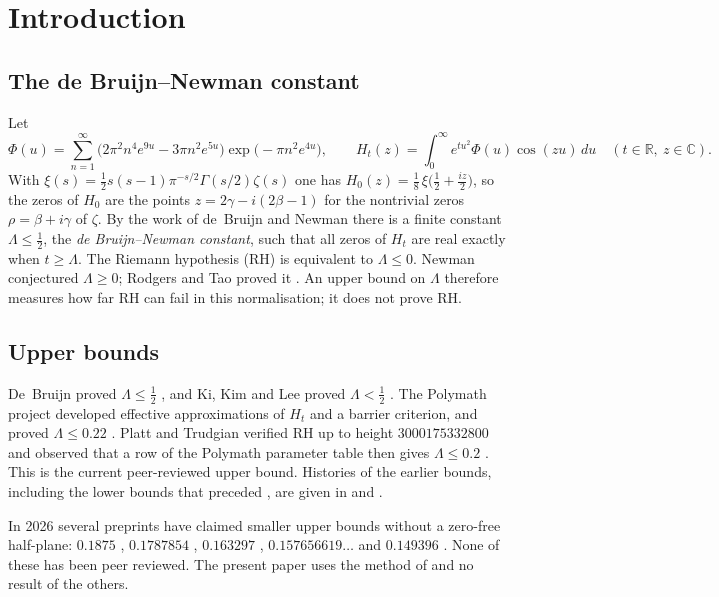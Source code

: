 \documentclass[11pt]{article}
\theoremstyle{definition}
\newcommand{\LB}{\Lambda}
\newcommand{\R}{\mathbb{R}}
\newcommand{\C}{\mathbb{C}}
\begin{document}
\section{Introduction}

\subsection{The de Bruijn--Newman constant}

Let
\[
\Phi(u)=\sum_{n=1}^{\infty}\bigl(2\pi^2n^4e^{9u}-3\pi n^2e^{5u}\bigr)\exp\bigl(-\pi n^2e^{4u}\bigr),
\qquad
H_t(z)=\int_0^\infty e^{tu^2}\Phi(u)\cos(zu)\,du
\quad(t\in\R,\ z\in\C).
\]
With $\xi(s)=\tfrac12s(s-1)\pi^{-s/2}\Gamma(s/2)\zeta(s)$ one has
$H_0(z)=\tfrac18\,\xi\bigl(\tfrac12+\tfrac{iz}2\bigr)$, so the zeros of $H_0$ are the
points $z=2\gamma-i(2\beta-1)$ for the nontrivial zeros $\rho=\beta+i\gamma$ of $\zeta$.
By the work of de~Bruijn \cite{deBruijn50} and Newman \cite{Newman76} there is a finite
constant $\LB\le\frac12$, the \emph{de Bruijn--Newman constant}, such that all zeros of
$H_t$ are real exactly when $t\ge\LB$. The Riemann hypothesis (RH) is equivalent to
$\LB\le0$. Newman conjectured $\LB\ge0$; Rodgers and Tao proved it \cite{RodgersTao20}.
An upper bound on $\LB$ therefore measures how far RH can fail in this normalisation;
it does not prove RH.

\subsection{Upper bounds}\label{sec:history}

De~Bruijn proved $\LB\le\frac12$ \cite{deBruijn50}, and Ki, Kim and Lee proved
$\LB<\frac12$ \cite{KiKimLee09}. The Polymath project developed effective
approximations of $H_t$ and a barrier criterion, and proved $\LB\le0.22$
\cite{Polymath19}. Platt and Trudgian verified RH up to height $3000175332800$ and
observed that a row of the Polymath parameter table then gives $\LB\le0.2$
\cite[Theorem~1 and Corollary~2]{PlattTrudgian21}. This is the current peer-reviewed
upper bound. Histories of the earlier bounds, including the lower bounds that preceded
\cite{RodgersTao20}, are given in \cite{RodgersTao20} and \cite{Polymath19}.

In 2026 several preprints have claimed smaller upper bounds without a zero-free half-plane:
$0.1875$ \cite{Mosaic26}, $0.1787854$ \cite{Gomila26}, $0.163297$ \cite{Raymond26a},
$0.157656619\ldots$ \cite{Gordon26} and $0.149396$ \cite{Raymond26}. None of these has
been peer reviewed. The present paper uses the method of \cite{Raymond26} and no
result of the others.
\end{document}
